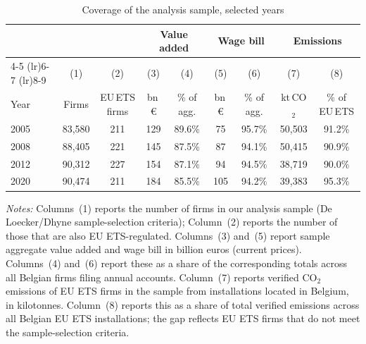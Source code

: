 \begin{table}[h]
    \centering
    \caption{Coverage of the analysis sample, selected years}
    \label{tab:sample_coverage}
    \small
    \begin{tabular}{l c c c c c c c c}
        \toprule
         & & & \multicolumn{2}{c}{Value added} & \multicolumn{2}{c}{Wage bill} & \multicolumn{2}{c}{Emissions} \\
        \cmidrule(lr){4-5} \cmidrule(lr){6-7} \cmidrule(lr){8-9}
         & (1) & (2) & (3) & (4) & (5) & (6) & (7) & (8) \\
        Year & Firms & EU\,ETS firms & bn\,\euro{} & \% of agg. & bn\,\euro{} & \% of agg. & kt\,CO$_2$ & \% of EU\,ETS \\
        \midrule\midrule
        2005 & 83,580 & 211 & 129 & 89.6\% & 75 & 95.7\% & 50,503 & 91.2\% \\ \midrule
        2008 & 88,405 & 221 & 145 & 87.5\% & 87 & 94.1\% & 50,415 & 90.9\% \\ \midrule
        2012 & 90,312 & 227 & 154 & 87.1\% & 94 & 94.5\% & 38,719 & 90.0\% \\ \midrule
        2020 & 90,474 & 211 & 184 & 85.5\% & 105 & 94.2\% & 39,383 & 95.3\% \\
        \bottomrule
    \end{tabular}
    \begin{minipage}{\textwidth}
        {\footnotesize \vspace{0.25cm} \noindent \textit{Notes:} Columns~(1) reports the number of firms in our analysis sample (De Loecker/Dhyne sample-selection criteria); Column~(2) reports the number of those that are also EU ETS-regulated. Columns~(3) and~(5) report sample aggregate value added and wage bill in billion euros (current prices). Columns~(4) and~(6) report these as a share of the corresponding totals across all Belgian firms filing annual accounts. Column~(7) reports verified CO$_2$ emissions of EU ETS firms in the sample from installations located in Belgium, in kilotonnes. Column~(8) reports this as a share of total verified emissions across all Belgian EU ETS installations; the gap reflects EU ETS firms that do not meet the sample-selection criteria.}
    \end{minipage}
\end{table}
